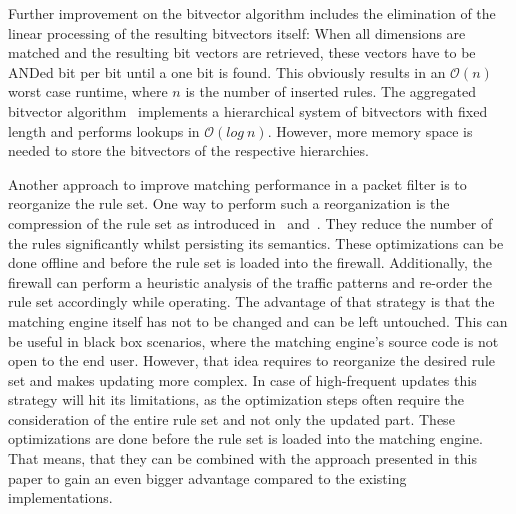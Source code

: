 \documentclass[a4paper,
		12pt,
		parskip=full,
		titlepage
		]{scrartcl}
\begin{document}
Further improvement on the bitvector algorithm includes the elimination of the linear processing of the resulting bitvectors itself:
When all dimensions are matched and the resulting bit vectors are retrieved, 
these vectors have to be ANDed bit per bit until a one bit is found.
This obviously results in an $\mathcal O(n)$ worst case runtime, where $n$ is the number of inserted rules.
The aggregated bitvector algorithm~\cite{abv} implements a hierarchical system 
of bitvectors with fixed length and performs lookups in $\mathcal O(log\ n)$.
However, more memory space is needed to store the bitvectors of the respective hierarchies.

Another approach to improve matching performance in a packet filter is to reorganize the rule set.
One way to perform such a reorganization is the compression of the rule set as 
introduced in~\cite{firewall_compressor} and~\cite{redundancy_removal}.
They reduce the number of the rules significantly whilst persisting its semantics.
These optimizations can be done offline and before the rule set is loaded into the firewall.
Additionally, the firewall can perform a heuristic analysis of the traffic patterns and re-order the rule set accordingly while operating.
The advantage of that strategy is that the matching engine itself has not to be changed and can be left untouched.
This can be useful in black box scenarios, where the matching engine's source code is not open to the end user.
However, that idea requires to reorganize the desired rule set and makes updating more complex.
In case of high-frequent updates this strategy will hit its limitations, 
as the optimization steps often require the consideration of the entire rule set and not only the updated part.
These optimizations are done before the rule set is loaded into the matching engine.
That means, that they can be combined with the approach presented in this paper to
gain an even bigger advantage compared to the existing implementations.
\end{document}
